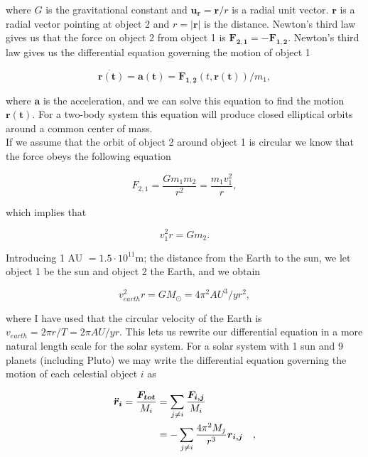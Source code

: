\documentclass[%
 reprint,
 nobalance,
 amsmath,amssymb,
 aps,
]{revtex4-1}
\begin{document}
where $G$ is the gravitational constant and $\bm{u_r} = \bm{r}/r$ is a radial unit vector. $\bm{r}$ is a radial vector pointing at object 2 and $r = \left|\bm{r}\right| $ is the distance. Newton's third law gives us that the force on object 2 from object 1 is $\bm{F_{2,1}} = - \bm{F_{1,2}}$. Newton's third law gives us the differential equation governing the motion of object 1

\begin{equation}
	\bm{\ddot{r(t)}} = \bm{a(t)} = \bm{F_{1,2}}(t, \bm{r(t)})/m_1,
\end{equation}

where $\bm{a}$ is the acceleration, and we can solve this equation to find the motion $\bm{r(t)}$. For a two-body system this equation will produce closed elliptical orbits around a common center of mass.\\
If we assume that the orbit of object 2 around object 1 is circular we know that the force obeys the following equation

\begin{equation}
	F_{2,1} = \frac{Gm_1 m_2}{r^2} = \frac{m_1 v_{1}^{2}}{r},
\end{equation}

which implies that

\begin{equation}
	v_{1}^{2}r = G m_2.
\end{equation}

Introducing 1 AU $= 1.5\cdot10^{11}$m; the distance from the Earth to the sun, we let object 1 be the sun and object 2 the Earth, and we obtain

\begin{equation}
	v_{earth}^2 r = G M_{\odot} = 4\pi^{2} AU^{3}/yr^{2},
\end{equation}

where I have used that the circular velocity of the Earth is $v_{earth} = 2\pi r/T = 2\pi AU/yr$. This lets us rewrite our differential equation in a more natural length scale for the solar system. For a solar system with 1 sun and 9 planets (including Pluto) we may write the differential equation governing the motion of each celestial object $i$ as

\begin{equation}{\label{eq:6}}
\begin{split}
	\bm{\ddot r_i} = \frac{\bm{F_{tot}}}{M_i}
	&= \sum_{j \neq i} \frac{\bm{F_{i,j}}}{M_i} \\
	&= -\sum_{j \neq i} \frac{4 \pi^{2} M_j}{r^{3}} \bm{r_{i,j}} \quad,
\end{split}
\end{equation}
\end{document}
